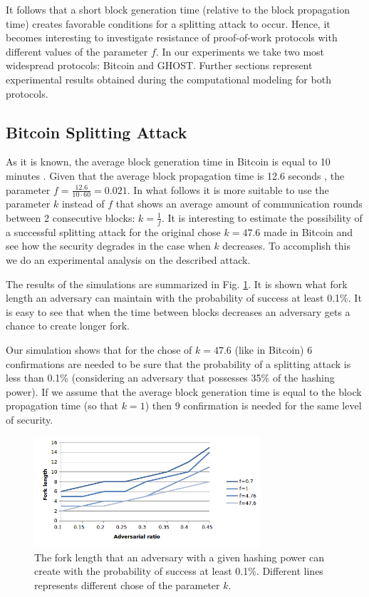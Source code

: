 \documentclass[10pt,a4paper]{article}
\numberwithin{equation}{section} %
\theoremstyle{plain}
\theoremstyle{definition}
\theoremstyle{remark}
\begin{document}
    It follows that a short block generation time (relative to the block propagation time) creates favorable conditions for a splitting attack to occur. Hence, it becomes interesting to investigate resistance of proof-of-work protocols with different values of the parameter \(f\). In our experiments we take two most widespread protocols: Bitcoin and GHOST. Further sections represent experimental results obtained during the computational modeling for both protocols.
	
	\subsection{Bitcoin Splitting Attack}
	
	As it is known, the average block generation time in Bitcoin is equal to 10 minutes \cite{N08}. Given that the average block propagation time is 12.6 seconds \cite{DW13}, the parameter \(f=\frac{12.6}{10\cdot60}=0.021\). In what follows it is more suitable to use the parameter \(k\) instead of \(f\) that shows an average amount of communication rounds between 2 consecutive blocks: \(k=\frac{1}{f}\).
	It is interesting to estimate the possibility of a successful splitting attack for the original chose \(k=47.6\) made in Bitcoin and see how the security degrades in the case when \(k\) decreases. To accomplish this we do an experimental analysis on the described attack.
	
	The results of the simulations are summarized in Fig. \ref{fig:btc_split_chart}. It is shown what fork length an adversary can maintain with the probability of success at least 0.1\%. It is easy to see that when the time between blocks decreases an adversary gets a chance to create longer fork. 
	
	Our simulation shows that for the chose of \(k=47.6\) (like in Bitcoin) 6 confirmations are needed to be sure that the probability of a splitting attack is less than 0.1\% (considering an adversary that possesses 35\% of the hashing power). If we assume that the average block generation time is equal to the block propagation time (so that \(k=1\)) then 9 confirmation is needed for the same level of security.   
	
	\begin{figure}[h]
        \centering
        \includegraphics[width=0.75\textwidth]{btc_split_chart}
        \caption{The fork length that an adversary with a given hashing power can create with the probability of success at least 0.1\%. Different lines represents different chose of the parameter \(k\).}
        \label{fig:btc_split_chart}
    \end{figure}
	
\end{document}
